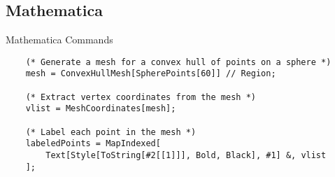 % 

\subsection{Mathematica}
\renewcommand{\listingFontSize}{\tiny} 
\begin{frame}{Mathematica Commands}
    \lstset{style=mathematica} %
    
    \begin{lstlisting}
    (* Generate a mesh for a convex hull of points on a sphere *)
    mesh = ConvexHullMesh[SpherePoints[60]] // Region;

    (* Extract vertex coordinates from the mesh *)
    vlist = MeshCoordinates[mesh];

    (* Label each point in the mesh *)
    labeledPoints = MapIndexed[
        Text[Style[ToString[#2[[1]]], Bold, Black], #1] &, vlist
    ];
    \end{lstlisting}
\end{frame}
 
\endinput  %
